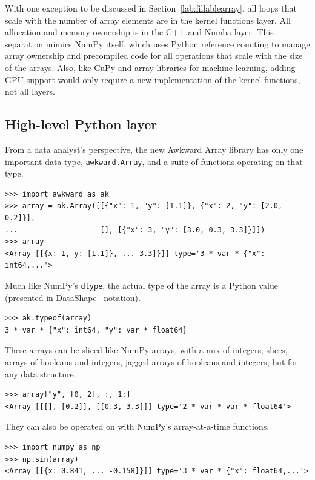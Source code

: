 \documentclass{webofc}
\begin{document}
\noindent With one exception to be discussed in Section~\ref{lab:fillablearray}, all loops that scale with the number of array elements are in the kernel functions layer. All allocation and memory ownership is in the C++ and Numba layer. This separation mimics NumPy itself, which uses Python reference counting to manage array ownership and precompiled code for all operations that scale with the size of the arrays. Also, like CuPy and array libraries for machine learning, adding GPU support would only require a new implementation of the kernel functions, not all layers.

\subsection{High-level Python layer}
\label{lab:high-level}

From a data analyst's perspective, the new Awkward Array library has only one important data type, \texttt{awkward.Array}, and a suite of functions operating on that type.

\begin{verbatim}
>>> import awkward as ak
>>> array = ak.Array([[{"x": 1, "y": [1.1]}, {"x": 2, "y": [2.0, 0.2]}],
...                   [], [{"x": 3, "y": [3.0, 0.3, 3.3]}]])
>>> array
<Array [[{x: 1, y: [1.1]}, ... 3.3]}]] type='3 * var * {"x": int64,...'>
\end{verbatim}

\noindent Much like NumPy's \texttt{dtype}, the actual type of the array is a Python value (presented in DataShape~\cite{datashape} notation).

\begin{verbatim}
>>> ak.typeof(array)
3 * var * {"x": int64, "y": var * float64}
\end{verbatim}

\noindent These arrays can be sliced like NumPy arrays, with a mix of integers, slices, arrays of booleans and integers, jagged arrays of booleans and integers, but for any data structure.

\begin{verbatim}
>>> array["y", [0, 2], :, 1:]
<Array [[[], [0.2]], [[0.3, 3.3]]] type='2 * var * var * float64'>
\end{verbatim}

\noindent They can also be operated on with NumPy's array-at-a-time functions.

\begin{verbatim}
>>> import numpy as np
>>> np.sin(array)
<Array [[{x: 0.841, ... -0.158]}]] type='3 * var * {"x": float64,...'>
\end{verbatim}
\end{document}
